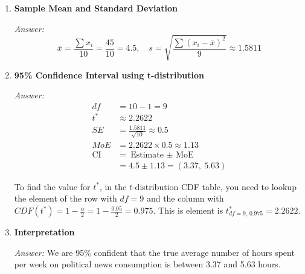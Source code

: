 \documentclass[12pt]{article}
\begin{document}
\begin{enumerate}[label=6.\arabic*]
    \item \textbf{Sample Mean and Standard Deviation}

    \textit{Answer:}
\[
    \bar{x} = \frac{\sum x_i}{10} = \frac{45}{10} = \boxed{4.5}, \quad s = \sqrt{\frac{\sum (x_i-\bar x)^2}{9}} \approx \boxed{1.5811}
\]

    \item \textbf{95\% Confidence Interval using t-distribution}

    \textit{Answer:}
    \begin{align*}
    df &= 10 - 1 = 9 \\
    t^* &\approx 2.2622 \\
    SE &= \frac{1.5811}{\sqrt{10}} \approx 0.5 \\
    MoE &= 2.2622 \times 0.5 \approx 1.13 \\
    \text{CI} &= \text{Estimate $\pm$ MoE} \\
    &=  4.5 \pm 1.13 = \boxed{(3.37,\ 5.63)}
    \end{align*}

    To find the value for $t^*$, in the $t$-distribution CDF table, you need to lookup the element of the row with $df=9$ and the column with $CDF(t^*)=1-\frac{\alpha}{2}=1-\frac{0.05}{2}=0.975$. This is element is  $t_{df=9,\,0.975}^* = 2.2622$.

    \item \textbf{Interpretation}

    \textit{Answer:} We are 95\% confident that the true average number of hours spent per week on political news consumption is between 3.37 and 5.63 hours.
\end{enumerate}
\end{document}
